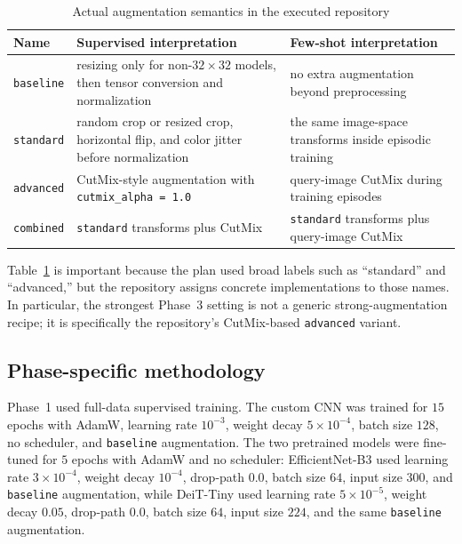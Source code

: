 \documentclass[12pt,a4paper]{article}
\begin{document}
\begin{table}[t!]
\centering
\caption{Actual augmentation semantics in the executed repository}
\label{tab:augmentations}
\smallskip
\footnotesize
\begin{tabularx}{\textwidth}{@{}l X X@{}}
\toprule
\textbf{Name} & \textbf{Supervised interpretation} & \textbf{Few-shot interpretation} \\
\midrule
\texttt{baseline} & resizing only for non-$32 \times 32$ models, then tensor conversion and normalization & no extra augmentation beyond preprocessing \\
\texttt{standard} & random crop or resized crop, horizontal flip, and color jitter before normalization & the same image-space transforms inside episodic training \\
\texttt{advanced} & CutMix-style augmentation with \texttt{cutmix\_alpha = 1.0} & query-image CutMix during training episodes \\
\texttt{combined} & \texttt{standard} transforms plus CutMix & \texttt{standard} transforms plus query-image CutMix \\
\bottomrule
\end{tabularx}
\end{table}

Table~\ref{tab:augmentations} is important because the plan used broad labels such as ``standard'' and ``advanced,'' but the repository assigns concrete implementations to those names. In particular, the strongest Phase~3 setting is not a generic strong-augmentation recipe; it is specifically the repository's CutMix-based \texttt{advanced} variant.

\subsection{Phase-specific methodology}
\label{subsec:methodology}

Phase~1 used full-data supervised training. The custom CNN was trained for $15$ epochs with AdamW, learning rate $10^{-3}$, weight decay $5 \times 10^{-4}$, batch size $128$, no scheduler, and \texttt{baseline} augmentation. The two pretrained models were fine-tuned for $5$ epochs with AdamW and no scheduler: EfficientNet-B3 used learning rate $3 \times 10^{-4}$, weight decay $10^{-4}$, drop-path $0.0$, batch size $64$, input size $300$, and \texttt{baseline} augmentation, while DeiT-Tiny used learning rate $5 \times 10^{-5}$, weight decay $0.05$, drop-path $0.0$, batch size $64$, input size $224$, and the same \texttt{baseline} augmentation.
\end{document}
